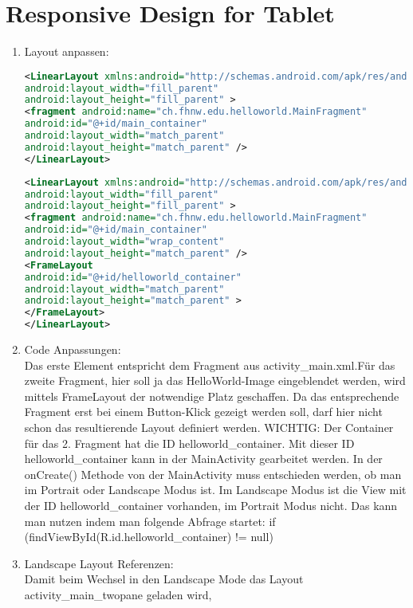 \documentclass[a4paper,10pt,titlepage=false]{scrreprt}
\begin{document}
\section{Responsive Design for Tablet}

\begin{enumerate}
 \item Layout anpassen:
 \begin{lstlisting}[language=xml,caption=MainActivity]
 <LinearLayout xmlns:android="http://schemas.android.com/apk/res/android"
android:layout_width="fill_parent"
android:layout_height="fill_parent" >
<fragment android:name="ch.fhnw.edu.helloworld.MainFragment"
android:id="@+id/main_container"
android:layout_width="match_parent"
android:layout_height="match_parent" />
</LinearLayout>
 \end{lstlisting}
  \begin{lstlisting}[language=xml,caption=MainActivityTwoPane]
<LinearLayout xmlns:android="http://schemas.android.com/apk/res/android"
android:layout_width="fill_parent"
android:layout_height="fill_parent" >
<fragment android:name="ch.fhnw.edu.helloworld.MainFragment"
android:id="@+id/main_container"
android:layout_width="wrap_content"
android:layout_height="match_parent" />
<FrameLayout
android:id="@+id/helloworld_container"
android:layout_width="match_parent"
android:layout_height="match_parent" >
</FrameLayout>
</LinearLayout>
 \end{lstlisting}
\item  Code Anpassungen: \\
Das erste Element entspricht dem Fragment aus activity\_main.xml.Für das zweite Fragment, hier
soll ja das HelloWorld-Image eingeblendet werden, wird mittels FrameLayout der notwendige Platz
geschaffen. Da das entsprechende Fragment erst bei einem Button-Klick gezeigt werden soll, darf
hier nicht schon das resultierende Layout definiert werden.
WICHTIG: Der Container für das 2. Fragment hat die ID helloworld\_container. Mit dieser ID
helloworld\_container kann in der MainActivity gearbeitet werden.
In der onCreate() Methode von der MainActivity muss entschieden werden, ob man im
Portrait oder Landscape Modus ist. Im Landscape Modus ist die View mit der ID
helloworld\_container vorhanden, im Portrait Modus nicht. Das kann man nutzen indem man
folgende Abfrage startet:
if (findViewById(R.id.helloworld\_container) != null) {}
\item Landscape Layout Referenzen: \\
Damit beim Wechsel in den Landscape Mode das Layout activity\_main\_twopane geladen wird,

\end{enumerate}
\end{document}
